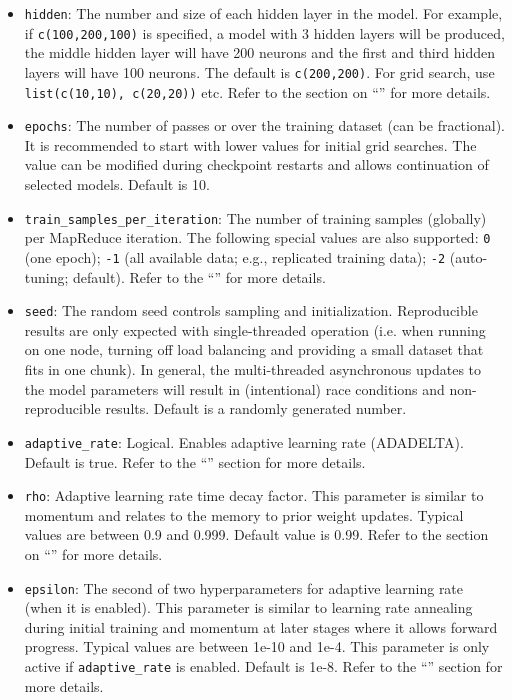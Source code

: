 \begin{itemize}
\item \texttt{hidden}: The number and size of each hidden layer in the model. For example, if \texttt{c(100,200,100)} is specified, a model with 3 hidden layers will be produced, the middle hidden layer will have 200 neurons and the first and third hidden layers will have 100 neurons. The default is \texttt{c(200,200)}. For grid search, use \texttt{list(c(10,10), c(20,20))} etc. Refer to the section on  ``'' for more details. 

\item \texttt{epochs}: The number of passes or over the training dataset (can be fractional). It is recommended to start with lower values for initial grid searches. The value can be modified during checkpoint restarts and allows continuation of selected models. Default is 10.

\item \texttt{train\_samples\_per\_iteration}: The number of training samples (globally) per MapReduce iteration. The following special values are also supported: \texttt{0} (one epoch); \texttt{-1} (all available data; e.g., replicated training data); \texttt{-2} (auto-tuning; default). Refer to the ``'' for more details.
\item \texttt{seed}: The random seed controls sampling and initialization. Reproducible results are only expected with single-threaded operation (i.e. when running on one node, turning off load balancing and providing a small dataset that fits in one chunk).  In general, the multi-threaded asynchronous updates to the model parameters will result in (intentional) race conditions and non-reproducible results.  Default is a randomly generated number.

\item \texttt{adaptive\_rate}: Logical.  Enables adaptive learning rate (ADADELTA). Default is true. Refer to the ``'' section for more details.

\item \texttt{rho}: Adaptive learning rate time decay factor. This parameter is similar to momentum and relates to the memory to prior weight updates. Typical values are between 0.9 and 0.999. Default value is 0.99. %
Refer to the section on ``'' for more details. 

\item \texttt{epsilon}: The second of two hyperparameters for adaptive learning rate (when it is enabled). This parameter is similar to learning rate annealing during initial training and momentum at later stages where it allows forward progress. Typical values are between 1e-10 and 1e-4. This parameter is only active if \texttt{adaptive\_rate} is enabled. Default is 1e-8. %
Refer to the ``'' section for more details.


\end{itemize}
